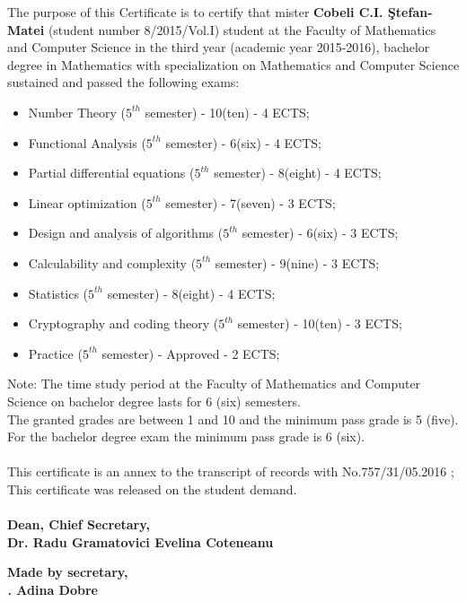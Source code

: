 \documentclass[a4paper,9pt,final]{scrartcl}
\begin{document}
	The purpose of this Certificate is to certify that mister \textbf{Cobeli C.I. \c Stefan-Matei} (student number 8/2015/Vol.I)  student at the Faculty of Mathematics and Computer Science in the third year (academic year 2015-2016), bachelor degree in Mathematics with specialization on Mathematics and Computer  Science sustained and passed the following exams:
	\begin{itemize}	
		 \item{Number Theory} ($5^{th}$ semester) - 10(ten) - 4 ECTS; 
		 \item{Functional Analysis} ($5^{th}$ semester) - 6(six) - 4 ECTS;
		 \item Partial differential equations ($5^{th}$ semester) - 8(eight) - 4 ECTS;
		 \item Linear optimization ($5^{th}$ semester) - 7(seven) - 3 ECTS;
		 \item Design and analysis of algorithms ($5^{th}$ semester) - 6(six) - 3 ECTS;
		 \item Calculability and complexity ($5^{th}$ semester) - 9(nine) - 3 ECTS;
		 \item Statistics ($5^{th}$ semester) - 8(eight) - 4 ECTS;
		\item Cryptography and coding theory ($5^{th}$ semester) - 10(ten) - 3 ECTS;
		\item Practice ($5^{th}$ semester) - Approved - 2 ECTS;	
	
	\end{itemize}
	

\begin{small}
	Note: The time study period at the Faculty of Mathematics and Computer Science on bachelor degree lasts for
6 (six) semesters. \\
The granted grades are between 1 and 10 and the minimum
pass grade is 5 (five). For the bachelor degree exam the minimum pass grade is 6 (six).
\end{small}
\paragraph{}
This certificate is an annex to the transcript of records with No.757/31/05.2016 ;\\
This certificate was released on the student demand.
\vspace{50pt}
\paragraph{}
\begin{Large}
	\textbf{Dean,  \hfill Chief Secretary,\\
	Dr. Radu Gramatovici \hfill  Evelina Coteneanu
		}
\end{Large}


\vspace{75pt}
\begin{Large}
\hfill \textbf{Made by secretary,\\
\textit{.} \hfill Adina Dobre}
\end{Large}
\hfill
	
\end{document}
